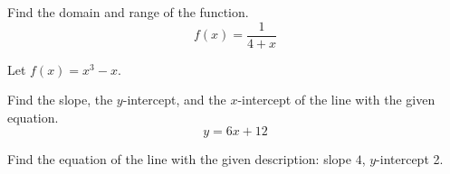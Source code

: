 \documentclass[12pt,addpoints, answers, fleqn]{exam}
\begin{document}
\begin{teacher}
\begin{questions}
\question 	%
Find the domain and range of the function.
\[
f \left( x \right) = \frac{1}{4+x}
\]
\begin{solution}
\end{solution}

\question 	%
Let $f\left(x\right) = x^3 - x$.



\question 	%

Find the slope, the $y$-intercept, and the $x$-intercept of the line with the given equation.
\[
y = 6x + 12
\]

\begin{solution}
\end{solution}

\question 	%
Find the equation of the line with the given description: slope $4$, $y$-intercept 2.
\begin{solution}
\end{solution}


\end{questions}
\end{teacher}
\end{document}
